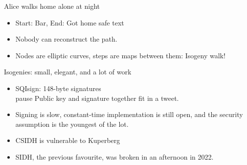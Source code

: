 \documentclass[aspectratio=169]{beamer}
\begin{document}
          \begin{frame}{Alice walks home alone at night}
            \centering
            \vfill
            \begin{itemize}
              \item Start: Bar, End: Got home safe text \pause
              \item \alert{Nobody can reconstruct the path.}\pause
              \item Nodes are elliptic curves, steps are maps between them\pause :
                Isogeny walk!
            \end{itemize}
          \end{frame}


          \begin{frame}{Isogenies: small, elegant, and a lot of work}
            \begin{itemize}
              \item SQIsign: 148-byte signatures \\ pause Public key and signature together fit in a
                tweet. \pause
              \item Signing is slow, \pause constant-time implementation is still
                open, \pause and the security assumption is the youngest of the lot.\pause
              \item CSIDH is vulnerable to Kuperberg \pause
              \item SIDH, the previous favourite, was broken in an afternoon in
                2022.
            \end{itemize}
          \end{frame}
\end{document}
